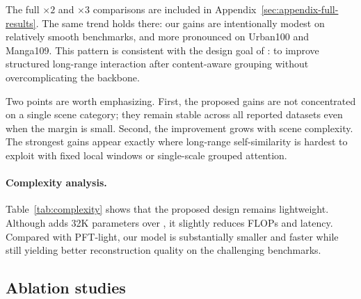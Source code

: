 The full \(\times2\) and \(\times3\) comparisons are included in Appendix~\ref{sec:appendix-full-results}. The same trend holds there: our gains are intentionally modest on relatively smooth benchmarks, and more pronounced on Urban100 and Manga109. This pattern is consistent with the design goal of \method{}: to improve structured long-range interaction after content-aware grouping without overcomplicating the backbone.

Two points are worth emphasizing. First, the proposed gains are not concentrated on a single scene category; they remain stable across all reported datasets even when the margin is small. Second, the improvement grows with scene complexity. The strongest gains appear exactly where long-range self-similarity is hardest to exploit with fixed local windows or single-scale grouped attention.

\paragraph{Complexity analysis.}
Table~\ref{tab:complexity} shows that the proposed design remains lightweight. Although \method{} adds 32K parameters over \baseline{}, it slightly reduces FLOPs and latency. Compared with PFT-light, our model is substantially smaller and faster while still yielding better reconstruction quality on the challenging benchmarks.

\begin{table}[t]
\centering
\caption{Model complexity under \(\times4\). The proposed multi-level design preserves the lightweight character of the model and slightly reduces measured FLOPs and latency relative to \baseline{}.}
\label{tab:complexity}
\end{table}

\subsection{Ablation studies}
